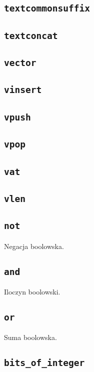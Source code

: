 \subsection{\texttt{textcommonsuffix}}
\subsection{\texttt{textconcat}}

\subsection{\texttt{vector}}
\subsection{\texttt{vinsert}}
\subsection{\texttt{vpush}}
\subsection{\texttt{vpop}}
\subsection{\texttt{vat}}
\subsection{\texttt{vlen}}

\subsection{\texttt{not}}

Negacja boolowska.

\subsection{\texttt{and}}

Iloczyn boolowski.

\subsection{\texttt{or}}

Suma boolowska.

\subsection{\texttt{bits\_of\_integer}}

